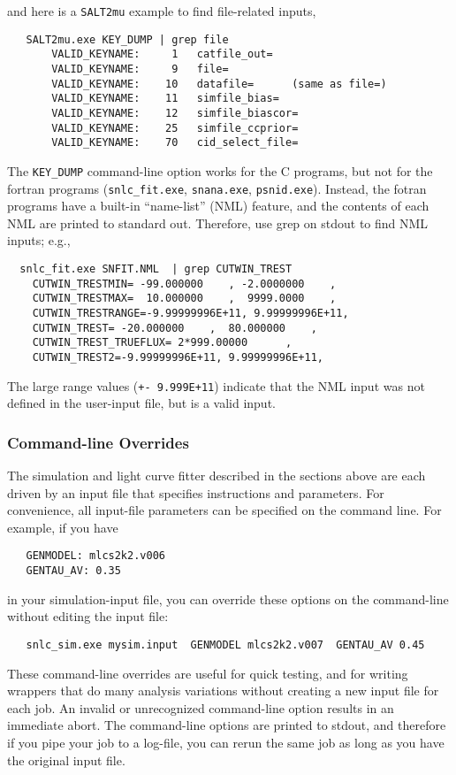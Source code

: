 \documentclass[12pt]{article}
\begin{document}
{\clearpage
\noindent
and here is a {\tt SALT2mu} example to find file-related inputs,
\begin{verbatim}
   SALT2mu.exe KEY_DUMP | grep file
       VALID_KEYNAME:     1   catfile_out=  
       VALID_KEYNAME:     9   file=  
       VALID_KEYNAME:    10   datafile=      (same as file=)
       VALID_KEYNAME:    11   simfile_bias=  
       VALID_KEYNAME:    12   simfile_biascor=  
       VALID_KEYNAME:    25   simfile_ccprior=  
       VALID_KEYNAME:    70   cid_select_file=  
\end{verbatim}

The {\tt KEY\_DUMP} command-line option works for the C programs,
but not for the fortran programs 
({\tt snlc\_fit.exe}, {\tt snana.exe}, {\tt psnid.exe}).
Instead, the fotran programs have a built-in ``name-list'' (NML) feature, 
and the contents of each NML are printed to standard out. 
Therefore, use grep on stdout to find NML inputs; 
e.g., 
\begin{verbatim}
  snlc_fit.exe SNFIT.NML  | grep CUTWIN_TREST
    CUTWIN_TRESTMIN= -99.000000    , -2.0000000    ,
    CUTWIN_TRESTMAX=  10.000000    ,  9999.0000    ,
    CUTWIN_TRESTRANGE=-9.99999996E+11, 9.99999996E+11,
    CUTWIN_TREST= -20.000000    ,  80.000000    ,
    CUTWIN_TREST_TRUEFLUX= 2*999.00000      ,
    CUTWIN_TREST2=-9.99999996E+11, 9.99999996E+11,
\end{verbatim}
The large range values ({\tt +- 9.999E+11}) indicate that
the NML input was not defined in the user-input file,
but is a valid input.

  \subsubsection{Command-line Overrides}
  \label{sss:override}

The simulation and light curve fitter described in the
sections above are each driven by an input file that specifies
instructions and parameters. For convenience, all input-file 
parameters can be specified on the command line.
For example, if you have
%
\begin{verbatim}
   GENMODEL: mlcs2k2.v006
   GENTAU_AV: 0.35
\end{verbatim}
%
in your simulation-input file, you can override these options
on the command-line without editing the input file:
\begin{verbatim}
   snlc_sim.exe mysim.input  GENMODEL mlcs2k2.v007  GENTAU_AV 0.45
\end{verbatim}
%
These command-line overrides are useful for quick testing,
and for writing wrappers that do many analysis variations 
without creating a new input file for each job.
An invalid or unrecognized command-line option results
in an immediate abort.
The command-line options are printed to stdout,
and therefore if you pipe your job to a log-file,
you can rerun the same job as long as you
have the original input file.


}
\end{document}
